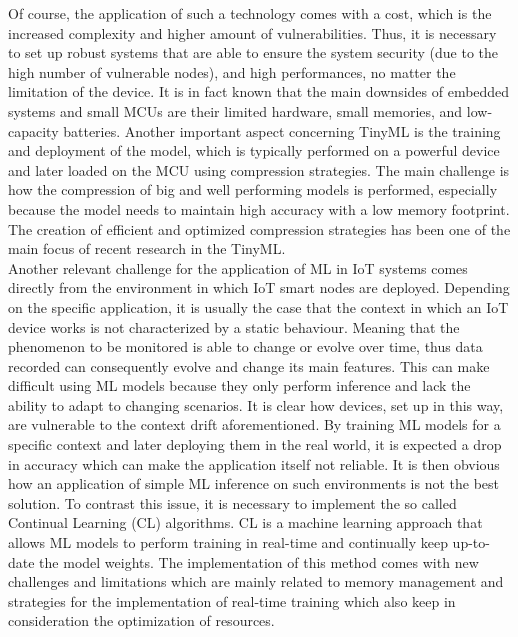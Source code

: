 \documentclass[12pt]{report}
\begin{document}
Of course, the application of such a technology comes with a cost, which is the increased complexity and higher amount of vulnerabilities. Thus, it is necessary to set up robust systems that are able to ensure the system security (due to the high number of vulnerable nodes), and high performances, no matter the limitation of the device. It is in fact known that the main downsides of embedded systems and small MCUs are their limited hardware, small memories, and low-capacity batteries. Another important aspect concerning TinyML is the training and deployment of the model, which is typically performed on a powerful device and later loaded on the MCU using compression strategies. The main challenge is how the compression of big and well performing models is performed, especially because the model needs to maintain high accuracy with a low memory footprint. The creation of efficient and optimized compression strategies has been one of the main focus of recent research in the TinyML. \\
Another relevant challenge for the application of ML in IoT systems comes directly from the environment in which IoT smart nodes are deployed. Depending on the specific application, it is usually the case that the context in which an IoT device works is not characterized by a static behaviour. Meaning that the phenomenon to be monitored is able to change or evolve over time, thus data recorded can consequently evolve and change its main features. This can make difficult using ML models because they only perform inference and lack the ability to adapt to changing scenarios. It is clear how devices, set up in this way, are vulnerable to the context drift aforementioned.
By training ML models for a specific context and later deploying them in the real world, it is expected a drop in accuracy which can make the application itself not reliable. It is then obvious how an application of simple ML inference on such environments is not the best solution. To contrast this issue, it is necessary to implement the so called Continual Learning (CL) algorithms. CL is a machine learning approach that allows ML models to perform training in real-time and continually keep up-to-date the model weights. The implementation of this method comes with new challenges and limitations which are mainly related to memory management and strategies for the implementation of real-time training which also keep in consideration the optimization of resources.
\bigskip
\end{document}
